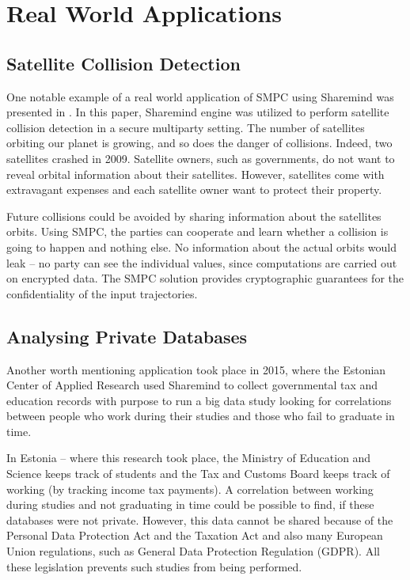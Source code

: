 \section{Real World Applications}\label{s:real-world-applications}

\subsection{Satellite Collision Detection}\label{s:satellite-collision-detection}
One notable example of a real world application of SMPC using Sharemind was presented in \cite{kamm2015secure}.
In this paper, Sharemind engine was utilized to perform satellite collision detection in a secure multiparty setting.
The number of satellites orbiting our planet is growing, and so does the danger of collisions.
Indeed, two satellites crashed in 2009.
Satellite owners, such as governments, do not want to reveal orbital information about their satellites.
However, satellites come with extravagant expenses and each satellite owner want to protect their property.

Future collisions could be avoided by sharing information about the satellites orbits.
Using SMPC, the parties can cooperate and learn whether a collision is going to happen and nothing else.
No information about the actual orbits would leak -- no party can see the individual values, since computations are carried out on encrypted data.
The SMPC solution provides cryptographic guarantees for the confidentiality of the input trajectories.


\subsection{Analysing Private Databases}\label{s:analysing-private-databases}
Another worth mentioning application took place in 2015, where the Estonian Center of Applied Research used Sharemind to collect governmental tax and education records with purpose to run a big data study looking for correlations between people who work during their studies and those who fail to graduate in time.

In Estonia -- where this research took place, the Ministry of Education and Science keeps track of students and the Tax and Customs Board keeps track of working (by tracking income tax payments).
A correlation between working during studies and not graduating in time could be possible to find, if these databases were not private.
However, this data cannot be shared because of the Personal Data Protection Act and the Taxation Act and also many European Union regulations, such as General Data Protection Regulation (GDPR).
All these legislation prevents such studies from being performed.

